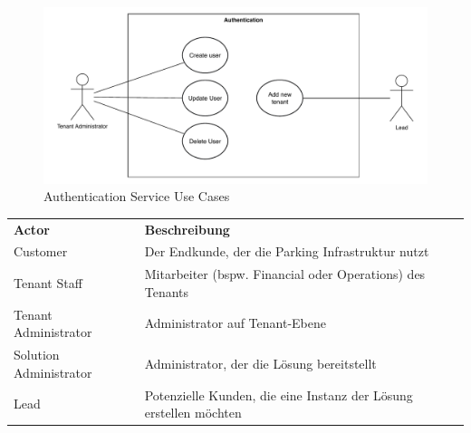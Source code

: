 \begin{figure}[ht]
    \centering
    \includegraphics[width=\textwidth]{resources/auth-use-cases.pdf}
    \caption{Authentication Service Use Cases}
    \label{fig:auth-use-cases}
\end{figure}

\renewcommand{\arraystretch}{1.5}
{
\begin{longtable}{l p{10cm}}
    \textbf{Actor} & \textbf{Beschreibung} \\ [1ex]
    Customer & Der Endkunde, der die Parking Infrastruktur nutzt \\ [0.5ex]
    Tenant Staff & Mitarbeiter (bspw. Financial oder Operations) des Tenants \\ [0.5ex]
    Tenant Administrator & Administrator auf Tenant-Ebene \\ [0.5ex]
    Solution Administrator & Administrator, der die Lösung bereitstellt \\ [0.5ex]
    Lead & Potenzielle Kunden, die eine Instanz der Lösung erstellen möchten \\ 
\end{longtable}}